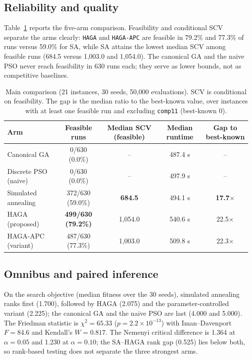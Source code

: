 \documentclass[journal]{IEEEtran}
\newcommand{\code}[1]{\texttt{#1}}
\begin{document}
\subsection{Reliability and quality}
Table~\ref{tab:main} reports the five-arm comparison. Feasibility and conditional SCV separate the arms clearly: \code{HAGA} and \code{HAGA-APC} are feasible in 79.2\% and 77.3\% of runs versus 59.0\% for SA, while SA attains the lowest median SCV among feasible runs (684.5 versus 1{,}003.0 and 1{,}054.0). The canonical GA and the naive PSO never reach feasibility in 630 runs each; they serve as lower bounds, not as competitive baselines.

\begin{table}[!t]
\caption{Main comparison (21 instances, 30 seeds, 50{,}000 evaluations). SCV is conditional on feasibility. The gap is the median ratio to the best-known value, over instances with at least one feasible run and excluding \code{comp11} (best-known $0$).}
\label{tab:main}
\centering
\small
\begin{tabular}{l c c c c}
\toprule
Arm & Feasible runs & Median SCV (feasible) & Median runtime & Gap to best-known \\
\midrule
Canonical GA          & 0/630 (0.0\%) & -- & 487.4 s & -- \\
Discrete PSO (naive)  & 0/630 (0.0\%) & -- & 497.9 s & -- \\
Simulated annealing   & 372/630 (59.0\%) & \textbf{684.5} & 494.1 s & \textbf{17.7}$\times$ \\
HAGA (proposed)        & \textbf{499/630 (79.2\%)} & 1{,}054.0 & 540.6 s & 22.5$\times$ \\
HAGA-APC (variant)     & 487/630 (77.3\%) & 1{,}003.0 & 509.8 s & 22.3$\times$ \\
\bottomrule
\end{tabular}
\end{table}

\subsection{Omnibus and paired inference}
On the search objective (median fitness over the 30 seeds), simulated annealing ranks first (1.700), followed by HAGA (2.075) and the parameter-controlled variant (2.225); the canonical GA and the naive PSO are last (4.000 and 5.000). The Friedman statistic is $\chi^2=65.33$ ($p=2.2\times10^{-13}$) with Iman--Davenport $F=84.6$ and Kendall's $W=0.817$. The Nemenyi critical difference is 1.364 at $\alpha=0.05$ and 1.230 at $\alpha=0.10$; the SA--HAGA rank gap (0.525) lies below both, so rank-based testing does not separate the three strongest arms.
\end{document}
